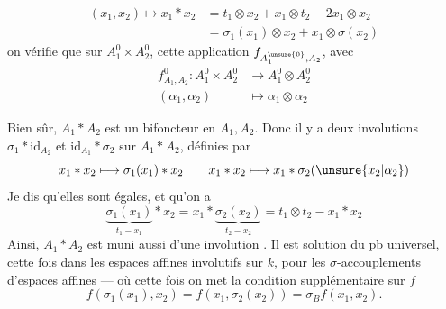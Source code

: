 \[
 \boxed{\begin{aligned}
 (x_1,x_2)\longmapsto x_1\ast x_2&=t_1\otimes x_2+x_1\otimes t_2-2x_1\otimes x_2\\
 &=\sigma_1(x_1)\otimes x_2+x_1\otimes\sigma(x_2)
 \end{aligned}}
\]
on vérifie que sur $A_1^0\times A_2^0$, cette application $f_{A_1^{\unsure{0}},A_2}$, avec
\[
 \begin{aligned}
 f^0_{A_1,A_2}: A_1^0\times A_2^0&\longrightarrow A_1^0\otimes A_2^0\\
 (\alpha_1,\alpha_2)&\longmapsto\alpha_1\otimes\alpha_2
 \end{aligned}
\]

 Bien sûr, $A_1\ast A_2$ est un bifoncteur en $A_1,A_2$. Donc il y a deux involutions $\sigma_1\ast\mathrm{id}_{A_2}$ et $\mathrm{id}_{A_1}\ast\sigma_2$ sur $A_1\ast A_2$, définies par
\[
 x_1\ast x_2\longmapsto\sigma_1(x_1)\ast x_2\qquad
 x_1\ast x_2\longmapsto x_1\ast\sigma_2(\unsure{x_2|\alpha_2})
\]
Je dis qu'elles sont égales, et qu'on a
\[
 \underbrace{\sigma_1(x_1)}_{t_1-x_1}\ast x_2=x_1\ast\underbrace{\sigma_2(x_2)}_{t_2-x_2}=t_1\otimes t_2-x_1\ast x_2
\]
Ainsi, $A_1\ast A_2$ est muni aussi d'une involution . Il est solution du pb universel, cette fois dans les espaces affines involutifs sur $k$, pour les $\sigma$-accouplements d'espaces affines --- où cette fois on met la condition supplémentaire sur $f$
\[
 f(\sigma_1(x_1),x_2)=f(x_1,\sigma_2(x_2))=\sigma_B f(x_1,x_2).
\]

